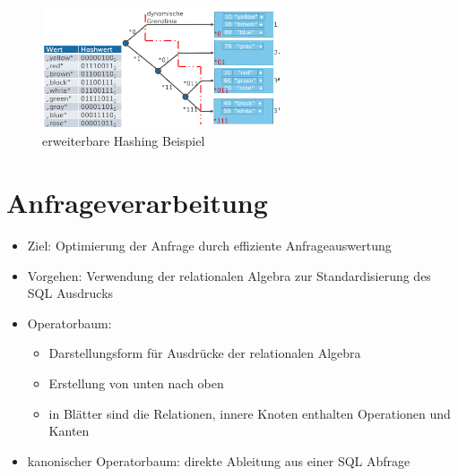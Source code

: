 \documentclass[a4paper]{article}
\begin{document}
    \begin{figure} [htp]
        \centering
        \includegraphics[width=7cm]{images/erweiterbaresHashing.png}
        \caption{erweiterbare Hashing Beispiel}
        \label{fig:erweiterbaresHashing}
    \end{figure}

\section{Anfrageverarbeitung}
\begin{itemize}
    \item Ziel: Optimierung der Anfrage durch effiziente Anfrageauswertung
    \item Vorgehen: Verwendung der relationalen Algebra zur Standardisierung des SQL Ausdrucks
    \item Operatorbaum:
    
    \begin{itemize}
        \item Darstellungsform für Ausdrücke der relationalen Algebra
        \item Erstellung von unten nach oben
        \item in Blätter sind die Relationen, innere Knoten enthalten Operationen und Kanten
    \end{itemize}
    
    \item kanonischer Operatorbaum: direkte Ableitung aus einer SQL Abfrage
\end{itemize}
\end{document}
